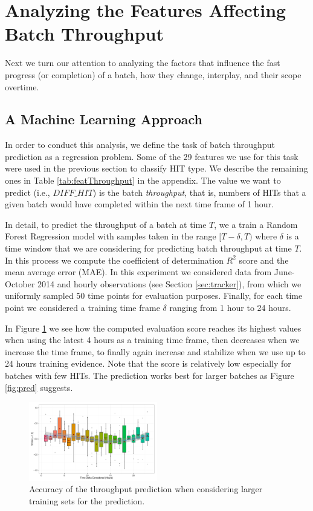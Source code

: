 \section{Analyzing the Features Affecting Batch Throughput}\label{sec:throughput}
Next we turn our attention to analyzing the factors that influence the fast progress (or completion) of a batch, how they change, interplay, and their scope overtime.
\subsection{A Machine Learning Approach}
In order to conduct this analysis, we define the task of batch throughput prediction as a regression problem.  Some of the   29  features we use for this task were used in the previous section to classify HIT type.  We describe the remaining ones in Table \ref{tab:featThroughput} in the appendix. The value  we want to predict (i.e.,   $DIFF\_HIT$) is the batch \emph{throughput}, that is, numbers of HITs that  a given batch would have completed within the next time frame of 1 hour.

In detail, to predict the throughput of a batch at time $T$, we a train a Random Forest Regression model with samples taken in the range $[T-\delta, T)$ where $\delta$ is a time window that we are   considering  for predicting batch throughput at time $T$. In this process we compute the coefficient of determination  $R^2$ score \cite{sklearn,sklearnweb} and the mean average error (MAE).
In this experiment we considered  data from June-October 2014 and hourly observations (see Section \ref{sec:tracker}), from which we uniformly sampled 50 time points for evaluation purposes. Finally, for each time point we considered a training time frame $\delta$ ranging from 1 hour to 24 hours. 

In Figure \ref{fig:accuracy} we see how the computed evaluation score reaches its highest values when using the latest 4 hours as a training time frame, then decreases when we increase the time frame, to finally again increase and stabilize when we use up to 24 hours training evidence.
Note that the score is relatively low especially for batches with few HITs. The prediction works best for larger batches as Figure \ref{fig:pred} suggests.

\begin{figure}[tb]
	\centering
		\includegraphics[width=0.5\textwidth]{figures/ML_accuracy}
	\caption{Accuracy of the throughput prediction when considering larger training sets for the prediction.}
	\label{fig:accuracy}
\end{figure}

